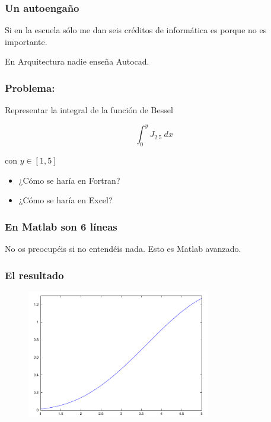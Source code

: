 \documentclass[12pt]{beamer}
\begin{document}
\begin{large}
\begin{frame}
  \frametitle{Un autoengaño}
  \begin{LARGE}
  \begin{center}
    Si en la escuela sólo me dan seis créditos de informática es
    porque no es importante.
  \end{center}
  \end{LARGE}
\end{frame}

\begin{frame}
  \begin{LARGE}
  \begin{center}
    En Arquitectura nadie enseña Autocad.
  \end{center}
  \end{LARGE}
\end{frame}

\begin{frame}
\frametitle{Problema:}
Representar la integral de la función de Bessel

\[ \int_0^y J_{2.5}\ dx \]

con $y \in [1,5]$

\begin{itemize}
\item ¿Cómo se haría en Fortran?
\item ¿Cómo se haría en Excel?
\end{itemize}
\end{frame}


\begin{frame}
\frametitle{En Matlab son 6 líneas}
\testcode
No os preocupéis si no entendéis nada.  Esto es Matlab avanzado.
\end{frame}

\begin{frame}
\frametitle{El resultado}
  \begin{figure}[h]
    \centering{}
    \includegraphics[width=8cm, keepaspectratio]{fig/primera.pdf}
  \end{figure}
\end{frame}



\end{large}
\end{document}
